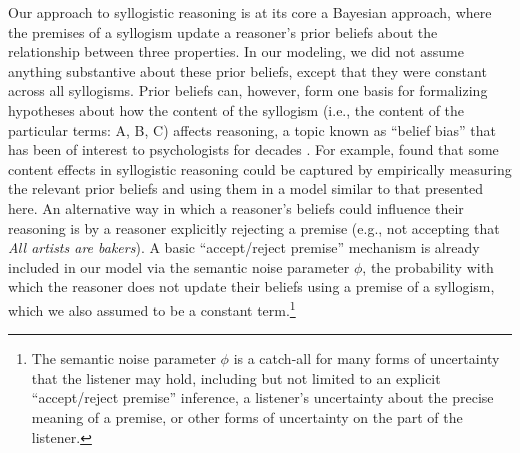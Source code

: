 \documentclass[floatsintext, man]{apa6}
\begin{document}
Our approach to syllogistic reasoning is at its core a Bayesian approach, where the premises of a syllogism update a reasoner's prior beliefs about the relationship between three properties. 
In our modeling, we did not assume anything substantive about these prior beliefs, except that they were constant across all syllogisms. 
Prior beliefs can, however, form one basis for formalizing hypotheses about how the content of the syllogism (i.e., the content of the particular terms: A, B, C) affects reasoning, a topic known as ``belief bias'' that has been of interest to psychologists for decades \cite{Oakhill1989, Oakhill1993, Cherubini1998}.
For example,  found that some content effects in syllogistic reasoning could be captured by empirically measuring the relevant prior beliefs and using them in a model similar to that presented here.
An alternative way in which a reasoner's beliefs could influence their reasoning is by a reasoner explicitly rejecting a premise (e.g., not accepting that \emph{All artists are bakers}).
A basic ``accept/reject premise'' mechanism is already included in our model via the semantic noise parameter $\phi$, the probability with which the reasoner does not update their beliefs using a premise of a syllogism, which we also assumed to be a constant term.\footnote{
The semantic noise parameter $\phi$ is a catch-all for many forms of uncertainty that the listener may hold, including but not limited to an explicit ``accept/reject premise'' inference, a listener's uncertainty about the precise meaning of a premise, or other forms of uncertainty on the part of the listener.
}
\end{document}
